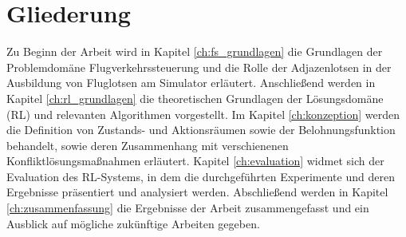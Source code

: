 \section{Gliederung}
\label{sec:intro:structure}
Zu Beginn der Arbeit wird in Kapitel \ref{ch:fs_grundlagen} die Grundlagen der Problemdomäne Flugverkehrssteuerung und die Rolle der Adjazenlotsen in der Ausbildung von Fluglotsen am Simulator erläutert.
Anschließend werden in Kapitel \ref{ch:rl_grundlagen} die theoretischen Grundlagen der Lösungsdomäne (\ac{RL}) und relevanten Algorithmen vorgestellt.
Im Kapitel \ref{ch:konzeption} werden die Definition von Zustands- und Aktionsräumen sowie der Belohnungsfunktion behandelt, sowie deren Zusammenhang mit verschienenen Konfliktlösungsmaßnahmen erläutert.
Kapitel \ref{ch:evaluation} widmet sich der Evaluation des \ac{RL}-Systems, in dem die durchgeführten Experimente und deren Ergebnisse präsentiert und analysiert werden.
Abschließend werden in Kapitel \ref{ch:zusammenfassung} die Ergebnisse der Arbeit zusammengefasst und ein Ausblick auf mögliche zukünftige Arbeiten gegeben.
